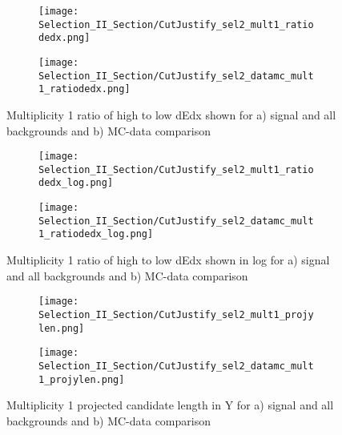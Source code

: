 \begin{figure}[H]
\centering
  \begin{subfigure}[t]{0.4\textwidth}
    \centering
\texttt{[image: Selection\_II\_Section/CutJustify\_sel2\_mult1\_ratiodedx.png]}
    \caption{ }
  \end{subfigure} 
  \hspace{20mm}
  \begin{subfigure}[t]{0.4\textwidth}
    \centering
\texttt{[image: Selection\_II\_Section/CutJustify\_sel2\_datamc\_mult1\_ratiodedx.png]}
    \caption{ }
  \end{subfigure} 
\caption{Multiplicity 1 ratio of high to low dEdx shown for a) signal and all backgrounds and b) MC-data comparison }
\label{fig:cutjust_sel2_mult1_ratiodedx}
\end{figure}

\begin{figure}[H]
\centering
  \begin{subfigure}[t]{0.4\textwidth}
    \centering
\texttt{[image: Selection\_II\_Section/CutJustify\_sel2\_mult1\_ratiodedx\_log.png]}
    \caption{ }
  \end{subfigure} 
  \hspace{20mm}
  \begin{subfigure}[t]{0.4\textwidth}
    \centering
\texttt{[image: Selection\_II\_Section/CutJustify\_sel2\_datamc\_mult1\_ratiodedx\_log.png]}
   \caption{ }
  \end{subfigure} 
\caption{Multiplicity 1 ratio of high to low dEdx shown in log for a) signal and all backgrounds and b) MC-data comparison }
\label{fig:cutjust_sel2_mult1_ratiodedx_log}
\end{figure}

\begin{figure}[H]
\centering
  \begin{subfigure}[t]{0.4\textwidth}
    \centering
\texttt{[image: Selection\_II\_Section/CutJustify\_sel2\_mult1\_projylen.png]}
    \caption{ }
  \end{subfigure} 
  \hspace{20mm}
  \begin{subfigure}[t]{0.4\textwidth}
    \centering
\texttt{[image: Selection\_II\_Section/CutJustify\_sel2\_datamc\_mult1\_projylen.png]}
   \caption{ }
  \end{subfigure} 
\caption{Multiplicity 1 projected candidate length in Y for a) signal and all backgrounds and b) MC-data comparison }
\label{fig:cutjust_sel2_mult1_projylen}
\end{figure}


